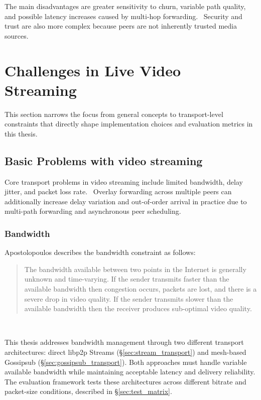 The main disadvantages are greater sensitivity to churn, variable path quality, and possible latency increases caused by multi-hop forwarding.~\cite{xuAnalysisCDNP2P2006,meskovicContentDeliveryArchitectures2012} Security and trust are also more complex because peers are not inherently trusted media sources.~\cite{SecurityConsiderations}

\section{Challenges in Live Video Streaming}
This section narrows the focus from general concepts to transport-level constraints that directly shape implementation choices and evaluation metrics in this thesis.

\subsection{Basic Problems with video streaming}
Core transport problems in video streaming include limited bandwidth, delay jitter, and packet loss rate.~\cite{apostolopoulosVideoStreamingConcepts} Overlay forwarding across multiple peers can additionally increase delay variation and out-of-order arrival in practice due to multi-path forwarding and asynchronous peer scheduling.

\subsubsection{Bandwidth}
Apostolopoulos describes the bandwidth constraint as follows:
\begin{quote}
The bandwidth available between two points in the Internet is generally
unknown and time-varying. If the sender transmits faster than the available
bandwidth then congestion occurs, packets are lost, and there is a severe
drop in video quality. If the sender transmits slower than the available
bandwidth then the receiver produces sub-optimal video quality.
\end{quote}~\cite{apostolopoulosVideoStreamingConcepts}

This thesis addresses bandwidth management through two different transport architectures: direct libp2p Streams (\S\ref{sec:stream_transport}) and mesh-based Gossipsub (\S\ref{sec:gossipsub_transport}). Both approaches must handle variable available bandwidth while maintaining acceptable latency and delivery reliability. The evaluation framework tests these architectures across different bitrate and packet-size conditions, described in \S\ref{sec:test_matrix}.
